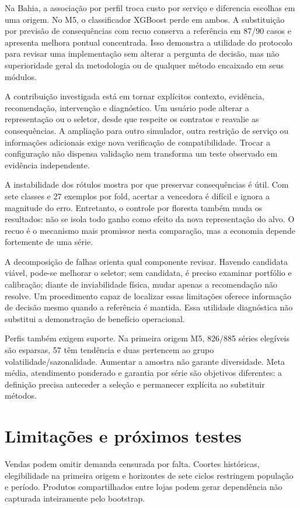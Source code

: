 \documentclass[preprint,12pt]{elsarticle}
\begin{document}
Na Bahia, a associação por perfil troca custo por serviço e diferencia escolhas em uma origem. No M5, o classificador XGBoost perde em ambos. A substituição por previsão de consequências com recuo conserva a referência em 87/90 casos e apresenta melhora pontual concentrada. Isso demonstra a utilidade do protocolo para revisar uma implementação sem alterar a pergunta de decisão, mas não superioridade geral da metodologia ou de qualquer método encaixado em seus módulos.

A contribuição investigada está em tornar explícitos contexto, evidência, recomendação, intervenção e diagnóstico. Um usuário pode alterar a representação ou o seletor, desde que respeite os contratos e reavalie as consequências. A ampliação para outro simulador, outra restrição de serviço ou informações adicionais exige nova verificação de compatibilidade. Trocar a configuração não dispensa validação nem transforma um teste observado em evidência independente.

A instabilidade dos rótulos mostra por que preservar consequências é útil. Com sete classes e 27 exemplos por fold, acertar a vencedora é difícil e ignora a magnitude do erro. Entretanto, o controle por floresta também muda os resultados: não se isola todo ganho como efeito da nova representação do alvo. O recuo é o mecanismo mais promissor nesta comparação, mas a economia depende fortemente de uma série.

A decomposição de falhas orienta qual componente revisar. Havendo candidata viável, pode-se melhorar o seletor; sem candidata, é preciso examinar portfólio e calibração; diante de inviabilidade física, mudar apenas a recomendação não resolve. Um procedimento capaz de localizar essas limitações oferece informação de decisão mesmo quando a referência é mantida. Essa utilidade diagnóstica não substitui a demonstração de benefício operacional.

Perfis também exigem suporte. Na primeira origem M5, 826/885 séries elegíveis são esparsas, 57 têm tendência e duas pertencem ao grupo volatilidade/sazonalidade. Aumentar a amostra não garante diversidade. Meta média, atendimento ponderado e garantia por série são objetivos diferentes: a definição precisa anteceder a seleção e permanecer explícita ao substituir métodos.

\section{Limitações e próximos testes}
Vendas podem omitir demanda censurada por falta. Coortes históricas, elegibilidade na primeira origem e horizontes de sete ciclos restringem população e período. Produtos compartilhados entre lojas podem gerar dependência não capturada inteiramente pelo bootstrap.
\end{document}

